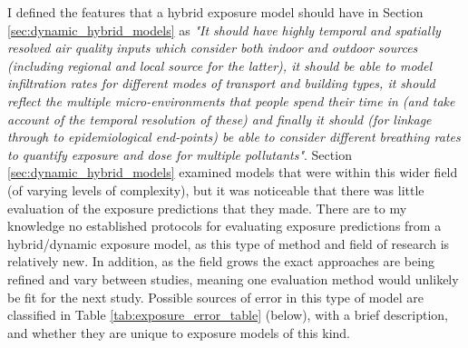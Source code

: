 I defined the features that a hybrid exposure model should have in Section \ref{sec:dynamic_hybrid_models} as \textit{"It should have highly temporal and spatially resolved air quality inputs which consider both indoor and outdoor sources (including regional and local source for the latter), it should be able to model infiltration rates for different modes of transport and building types, it should reflect the multiple micro-environments that people spend their time in (and take account of the temporal resolution of these) and finally it should (for linkage through to epidemiological end-points) be able to consider different breathing rates to quantify exposure and dose for multiple pollutants"}. Section \ref{sec:dynamic_hybrid_models} examined models that were within this wider field (of varying levels of complexity), but it was noticeable that there was little evaluation of the exposure predictions that they made. There are to my knowledge no established protocols for evaluating exposure predictions from a hybrid/dynamic exposure model, as this type of method and field of research is relatively new. In addition, as the field grows the exact approaches are being refined and vary between studies, meaning one evaluation method would unlikely be fit for the next study. Possible sources of error in this type of model are classified in Table \ref{tab:exposure_error_table} (below), with a brief description, and whether they are unique to exposure models of this kind.


